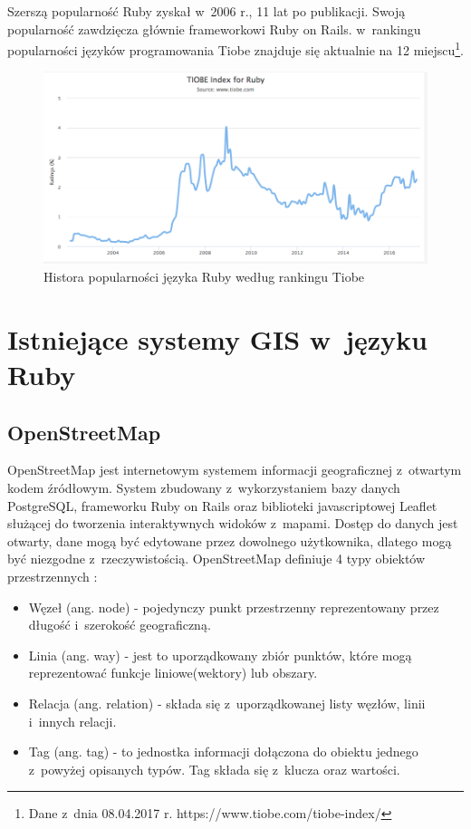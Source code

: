 \documentclass[archivemode]{mgr}
\begin{document}
Szerszą popularność Ruby zyskał w~2006 r., 11 lat po publikacji. Swoją popularność zawdzięcza głównie frameworkowi Ruby on Rails. w~rankingu popularności języków programowania Tiobe znajduje się aktualnie na 12 miejscu\footnote{Dane z~dnia 08.04.2017 r. https://www.tiobe.com/tiobe-index/}.

\begin{figure}[H]
  \centering
  \includegraphics[width=0.5\linewidth]{pictures/ruby_tiobe}
  \caption{Histora popularności języka Ruby według rankingu Tiobe}
  \label{fig:ruby_tiobe}
\end{figure}

\chapter{Istniejące systemy GIS w~języku Ruby}

\section{OpenStreetMap}

  OpenStreetMap jest internetowym systemem informacji geograficznej z~otwartym kodem źródłowym. System zbudowany z~wykorzystaniem bazy danych PostgreSQL, frameworku Ruby on Rails oraz biblioteki javascriptowej Leaflet służącej do tworzenia interaktywnych widoków z~mapami. Dostęp do danych jest otwarty, dane mogą być edytowane przez dowolnego użytkownika, dlatego mogą być niezgodne z~rzeczywistością. OpenStreetMap definiuje 4 typy obiektów przestrzennych \cite{doc_osm}:
  \begin{itemize}
    \item Węzeł (ang. node) - pojedynczy punkt przestrzenny reprezentowany przez długość i~szerokość geograficzną.
    \item Linia (ang. way) - jest to uporządkowany zbiór punktów, które mogą reprezentować funkcje liniowe(wektory) lub obszary.
    \item Relacja (ang. relation) - składa się z~uporządkowanej listy węzłów, linii i~innych relacji.
    \item Tag (ang. tag) - to jednostka informacji dołączona do obiektu jednego z~powyżej opisanych typów. Tag składa się z~klucza oraz wartości. 
  \end{itemize}
\end{document}
